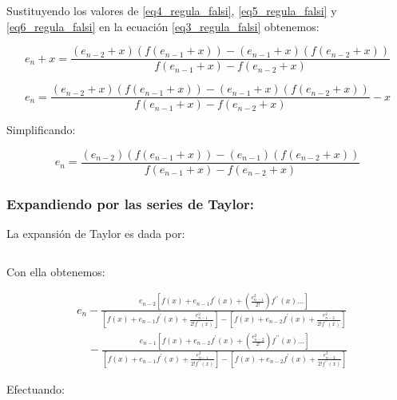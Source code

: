 Sustituyendo los valores de \eqref{eq4_regula_falsi}, \eqref{eq5_regula_falsi} y \eqref{eq6_regula_falsi} en la ecuación \eqref{eq3_regula_falsi} obtenemos:

\begin{displaymath}
    e_n + x = \frac{(e_{n-2} + x)(f(e_{n-1} + x))-(e_{n-1} + x)(f(e_{n-2} + x))}{f(e_{n-1} + x) - f(e_{n-2} + x)}
\end{displaymath}

\begin{displaymath}
    e_n = \frac{(e_{n-2} + x)(f(e_{n-1} + x))-(e_{n-1} + x)(f(e_{n-2} + x))}{f(e_{n-1} + x) - f(e_{n-2} + x)} - x
\end{displaymath}

Simplificando:

\begin{equation}
    \label{eq7_regula_falsi}
    e_n = \frac{(e_{n-2})(f(e_{n-1} + x))-(e_{n-1})(f(e_{n-2} + x))}{f(e_{n-1} + x) - f(e_{n-2} + x)}
\end{equation}

\subsubsection{Expandiendo por las series de Taylor:}

La expansión de Taylor es dada por:

\begin{displaymath}
    [f(a + h) = f(a) + hf^\prime(a) + \frac{h^2}{2}f^{\prime\prime}(a) + \ldots]
\end{displaymath}

Con ella obtenemos:

\begin{displaymath}
    \begin{split}
        &e_n - \frac{e_{n-2}[f(x) + e_{n-1}f^\prime (x) + (\frac{e_{n-1}^2}{2!}) f^{\prime\prime} (x) \ldots]}{[f(x) + e_{n-1}f^\prime (x) + \frac{e_{n-1}^2}{2! f^{\prime\prime} (x)}] - [f(x) + e_{n-2}f^\prime (x) + \frac{e_{n-2}^2}{2! f^{\prime\prime} (x)}]}\\
        &\quad - \frac{e_{n-1}[f(x) + e_{n-2}f^\prime (x) + (\frac{e_{n-2}^2}{2!}) f^{\prime\prime} (x) \ldots]}{[f(x) + e_{n-1}f^\prime (x) + \frac{e_{n-1}^2}{2! f^{\prime\prime} (x)}] - [f(x) + e_{n-2}f^\prime (x) + \frac{e_{n-2}^2}{2! f^{\prime\prime} (x)}]}
    \end{split}
\end{displaymath}

Efectuando:

